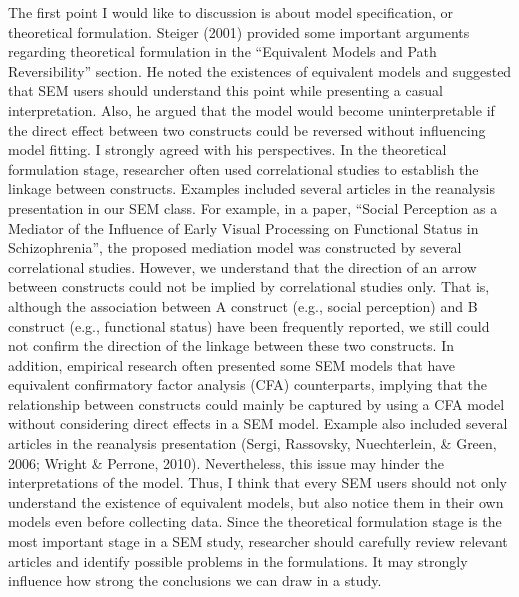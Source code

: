 \documentclass[jou]{apa6}
\theoremstyle{definition}
\theoremstyle{definition}
\theoremstyle{definition}
\theoremstyle{remark}
\begin{document}
The first point I would like to discussion is about model specification,
or theoretical formulation. Steiger (2001) provided some important
arguments regarding theoretical formulation in the \enquote{Equivalent
Models and Path Reversibility} section. He noted the existences of
equivalent models and suggested that SEM users should understand this
point while presenting a casual interpretation. Also, he argued that the
model would become uninterpretable if the direct effect between two
constructs could be reversed without influencing model fitting. I
strongly agreed with his perspectives. In the theoretical formulation
stage, researcher often used correlational studies to establish the
linkage between constructs. Examples included several articles in the
reanalysis presentation in our SEM class. For example, in a paper,
\enquote{Social Perception as a Mediator of the Influence of Early
Visual Processing on Functional Status in Schizophrenia}, the proposed
mediation model was constructed by several correlational studies.
However, we understand that the direction of an arrow between constructs
could not be implied by correlational studies only. That is, although
the association between A construct (e.g., social perception) and B
construct (e.g., functional status) have been frequently reported, we
still could not confirm the direction of the linkage between these two
constructs. In addition, empirical research often presented some SEM
models that have equivalent confirmatory factor analysis (CFA)
counterparts, implying that the relationship between constructs could
mainly be captured by using a CFA model without considering direct
effects in a SEM model. Example also included several articles in the
reanalysis presentation (Sergi, Rassovsky, Nuechterlein, \& Green, 2006;
Wright \& Perrone, 2010). Nevertheless, this issue may hinder the
interpretations of the model. Thus, I think that every SEM users should
not only understand the existence of equivalent models, but also notice
them in their own models even before collecting data. Since the
theoretical formulation stage is the most important stage in a SEM
study, researcher should carefully review relevant articles and identify
possible problems in the formulations. It may strongly influence how
strong the conclusions we can draw in a study.
\end{document}
